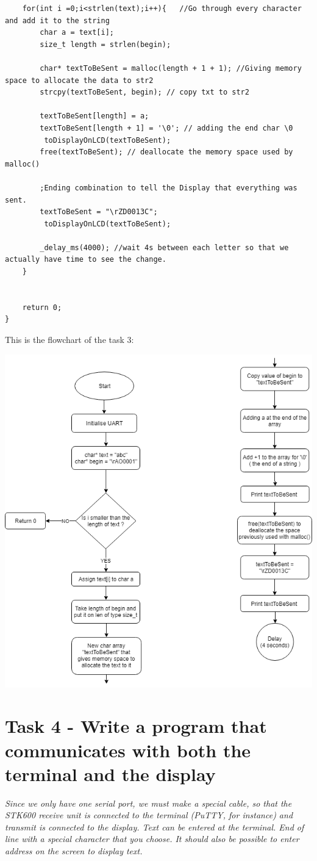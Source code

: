 \documentclass[a4paper,12pt]{article}
\begin{document}
\begin{lstlisting}
	for(int i =0;i<strlen(text);i++){ 	//Go through every character and add it to the string 
		char a = text[i];
		size_t length = strlen(begin);
		
		char* textToBeSent = malloc(length + 1 + 1); //Giving memory space to allocate the data to str2
		strcpy(textToBeSent, begin); // copy txt to str2
		
		textToBeSent[length] = a;  
		textToBeSent[length + 1] = '\0'; // adding the end char \0
		 toDisplayOnLCD(textToBeSent); 
		free(textToBeSent); // deallocate the memory space used by malloc()
		
		;Ending combination to tell the Display that everything was sent.
		textToBeSent = "\rZD0013C";
		 toDisplayOnLCD(textToBeSent);

		_delay_ms(4000); //wait 4s between each letter so that we actually have time to see the change.
	}

	
	return 0;
}
\end{lstlisting}
\newpage
This is the flowchart of the task 3:
\begin{center}
\includegraphics[scale=0.7]{img/TASK3.png}
\end{center}
\newpage
\section{Task 4 - Write a program that communicates with both the terminal and the display}
\textit{Since we only have one serial port, we must make a special cable, so that the STK600 receive unit
is connected to the terminal (PuTTY, for instance) and transmit is connected to the display. Text
can be entered at the terminal. End of line with a special character that you choose. It should also
be possible to enter address on the screen to display text.}
\end{document}
